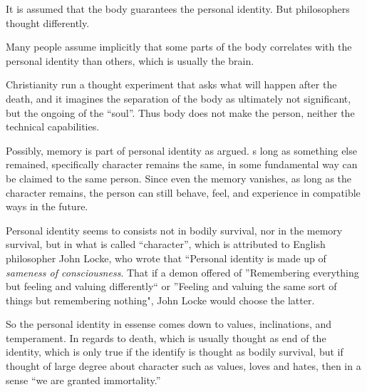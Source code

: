 \documentclass[12pt, UTF8]{article}
\begin{document}
	It is assumed that the body guarantees the personal identity. But philosophers thought differently.
	
	Many people assume implicitly that some parts of the body correlates with the personal identity than others, which is usually the brain.
	
	Christianity run a thought experiment that asks what will happen after the death, and it imagines the separation of the body as ultimately not significant, but the ongoing of the ``soul''. Thus body does not make the person, neither the technical capabilities.
	
	Possibly, memory is part of personal identity as argued. s long as something else remained, specifically character remains the same, in some fundamental way can be claimed to the same person. Since even the memory vanishes, as long as the character remains, the person can still behave, feel, and experience in compatible ways in the future.
	
	Personal identity seems to consists not in bodily survival, nor in the memory survival, but in what is called ``character'', which is attributed to English philosopher John Locke, who wrote that ``Personal identity is made up of \emph{sameness of consciousness}. That if a demon offered of ''Remembering everything but feeling and valuing differently`` or ''Feeling and valuing the same sort of things but remembering nothing", John Locke would choose the latter.
	
	So the personal identity in essense comes down to values, inclinations, and temperament. In regards to death, which is usually thought as end of the identity, which is only true if the identify is thought as bodily survival, but if thought of large degree about character such as values, loves and hates, then in a sense ``we are granted immortality.''
\end{document}
